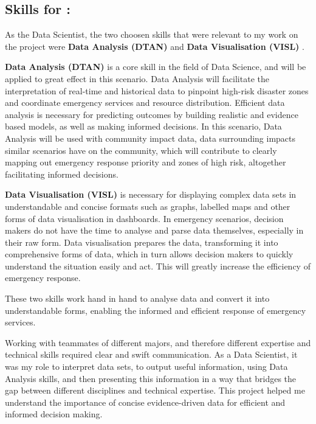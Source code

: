 \documentclass[a4paper, 11pt]{report}
\begin{document}
\newpage

\subsection{Skills for \majB: \studB}

As the Data Scientist, the two choosen skills that were relevant to my work on the project were \textbf{Data Analysis (DTAN)} \cite{sfia} and \textbf{Data Visualisation (VISL)} \cite{sfia}.\newline

\textbf{Data Analysis (DTAN)} \cite{sfia} is a core skill in the field of Data Science, and will be applied to great effect in this scenario. Data Analysis will facilitate the interpretation of real-time and historical data to pinpoint high-risk disaster zones and coordinate emergency services and resource distribution. Efficient data analysis is necessary for predicting outcomes by building realistic and evidence based models, as well as making informed decisions. In this scenario, Data Analysis will be used with community impact data, data surrounding impacts similar scenarios have on the community, which will contribute to clearly mapping out emergency response priority and zones of high risk, altogether facilitating informed decisions.\newline

\textbf{Data Visualisation (VISL)} \cite{sfia} is necessary for displaying complex data sets in understandable and concise formats such as graphs, labelled maps and other forms of data visualisation in dashboards. In emergency scenarios, decision makers do not have the time to analyse and parse data themselves, especially in their raw form. Data visualisation prepares the data, transforming it into comprehensive forms of data, which in turn allows decision makers to quickly understand the situation easily and act. This will greatly increase the efficiency of emergency response.\newline

These two skills work hand in hand to analyse data and convert it into understandable forms, enabling the informed and efficient response of emergency services.\newline

Working with teammates of different majors, and therefore different expertise and technical skills required clear and swift communication. As a Data Scientist, it was my role to interpret data sets, to output useful information, using Data Analysis skills, and then presenting this information in a way that bridges the gap between different disciplines and technical expertise. This project helped me understand the importance of concise evidence-driven data for efficient and informed decision making.\newline
\end{document}
